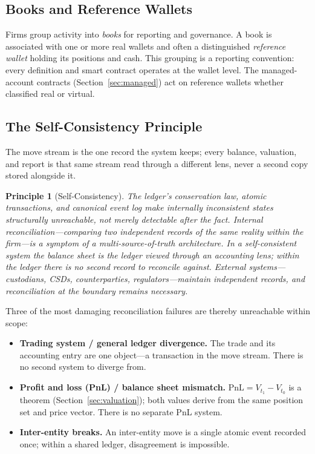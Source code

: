 \documentclass[11pt,a4paper]{article}
\newtheorem{principle}[definition]{Principle}
\begin{document}
\subsection{Books and Reference Wallets}

Firms group activity into \emph{books} for reporting and governance. A book is associated with one or more real wallets and often a distinguished \emph{reference wallet} holding its positions and cash. This grouping is a reporting convention: every definition and smart contract operates at the wallet level. The managed-account contracts (Section~\ref{sec:managed}) act on reference wallets whether classified real or virtual.

\subsection{The Self-Consistency Principle}

The move stream is the one record the system keeps; every balance, valuation, and report is that same stream read through a different lens, never a second copy stored alongside it.

\begin{principle}[Self-Consistency]
The ledger's conservation law, atomic transactions, and canonical event log make internally inconsistent states structurally unreachable, not merely detectable after the fact. Internal reconciliation---comparing two independent records of the same reality within the firm---is a symptom of a multi-source-of-truth architecture. In a self-consistent system the balance sheet \emph{is} the ledger viewed through an accounting lens; within the ledger there is no second record to reconcile against. External systems---custodians, CSDs, counterparties, regulators---maintain independent records, and reconciliation at the boundary remains necessary.
\end{principle}

Three of the most damaging reconciliation failures are thereby unreachable within scope:

\begin{itemize}[nosep]
\item \textbf{Trading system / general ledger divergence.} The trade and its accounting entry are one object---a transaction in the move stream. There is no second system to diverge from.
\item \textbf{Profit and loss (PnL) / balance sheet mismatch.} $\mathrm{PnL} = V_{t_1} - V_{t_0}$ is a theorem (Section~\ref{sec:valuation}); both values derive from the same position set and price vector. There is no separate PnL system.
\item \textbf{Inter-entity breaks.} An inter-entity move is a single atomic event recorded once; within a shared ledger, disagreement is impossible.
\end{itemize}
\end{document}
